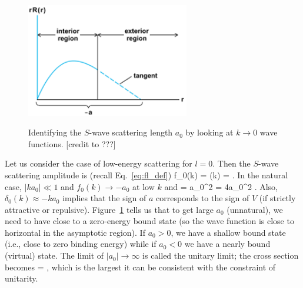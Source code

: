   \begin{figure}[tbh]
  \begin{center}
    \includegraphics[width=2.8in]{figures/scattering_length_positive.png}~~~~~%
    \caption{Identifying the $S$-wave scattering length $a_0$ by looking at
    $k\rightarrow 0$ wave functions. [credit to ???]}
    \label{fig:scattering_length_figures}
  \end{center}
  \end{figure}

Let us consider the case of low-energy scattering for $l=0$.  Then the $S$-wave scattering 
amplitude is (recall Eq.~\eqref{eq:fl_def}) 
\beq
   f_0(k) =    
      \qquad \Longrightarrow  \qquad
      \sigma(k) =  \;.
   \label{eq:f0_ere}
\eeq 
In the natural case, $|ka_0| \ll 1$ and $f_0(k)\rightarrow -a_0$ at low $k$ and
\beq
     = a_0^2 \qquad \Longrightarrow \qquad \sigma = 4\pi a_0^2
    \;.
\eeq
Also, $\delta_0(k) \approx -ka_0$ implies that the sign of $a$ corresponds to the sign of $V$
(if strictly attractive or repulsive).
Figure~\ref{fig:scattering_length_figures} tells us that to get large $a_0$ (unnatural),
we need to have close to a zero-energy bound state (so the wave function is close to
horizontal in the asymptotic region).  
If $a_0>0$, we have a shallow  bound state (i.e., close to zero binding energy) 
while if $a_0<0$ we have a nearly bound (virtual)
state.
%
The limit of $|a_0| \rightarrow \infty$ is called the unitary limit; the cross section
becomes
\beq
    \longrightarrow {}
   \qquad \Longrightarrow \qquad \sigma = 
   \;,
\eeq
which is the largest it can be consistent with the constraint of unitarity.



